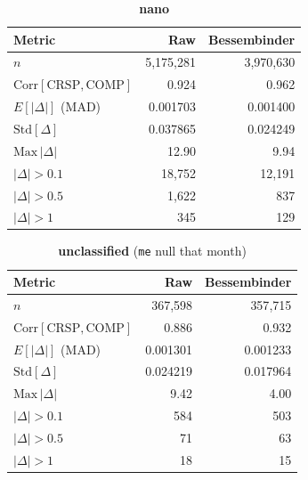 \documentclass[11pt]{article}
\newcommand{\cmphead}{%
  \toprule
  Metric & Raw & Bessembinder \\
  \midrule
}
\begin{document}
\begin{table}[h]
\centering
\caption*{\textbf{nano}}
\begin{tabular}{lrr}
\cmphead
$n$                                          & 5{,}175{,}281 & 3{,}970{,}630 \\
$\mathrm{Corr}[\mathrm{CRSP}, \mathrm{COMP}]$& 0.924 & 0.962 \\
$E[|\Delta|]$ (MAD)                          & 0.001703 & 0.001400 \\
$\mathrm{Std}[\Delta]$                       & 0.037865 & 0.024249 \\
$\mathrm{Max}\,|\Delta|$                     & 12.90 & 9.94 \\
$|\Delta|>0.1$                               & 18{,}752 & 12{,}191 \\
$|\Delta|>0.5$                               & 1{,}622 & 837 \\
$|\Delta|>1$                                 & 345 & 129 \\
\bottomrule
\end{tabular}
\end{table}

\begin{table}[h]
\centering
\caption*{\textbf{unclassified} (\texttt{me} null that month)}
\begin{tabular}{lrr}
\cmphead
$n$                                          & 367{,}598 & 357{,}715 \\
$\mathrm{Corr}[\mathrm{CRSP}, \mathrm{COMP}]$& 0.886 & 0.932 \\
$E[|\Delta|]$ (MAD)                          & 0.001301 & 0.001233 \\
$\mathrm{Std}[\Delta]$                       & 0.024219 & 0.017964 \\
$\mathrm{Max}\,|\Delta|$                     & 9.42 & 4.00 \\
$|\Delta|>0.1$                               & 584 & 503 \\
$|\Delta|>0.5$                               & 71 & 63 \\
$|\Delta|>1$                                 & 18 & 15 \\
\bottomrule
\end{tabular}
\end{table}
\end{document}

